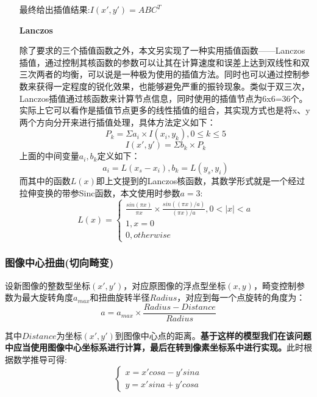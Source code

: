 \documentclass[UTF8]{ctexart}
\begin{document}
\begin{itemize}
最终给出插值结果:$I(x',y')=ABC^T$

    \item [\textbf{Lanczos}]
    
    除了要求的三个插值函数之外，本文另实现了一种实用插值函数——Lanczos插值，通过控制其核函数的参数可以让其在计算速度和误差上达到双线性和双三次两者的均衡，可以说是一种极为使用的插值方法。同时也可以通过控制参数来获得一定程度的锐化效果，也能够避免严重的振铃现象。类似于双三次，Lanczos插值通过核函数来计算节点信息，同时使用的插值节点为6x6=36个。实际上它可以看作是插值节点更多的线性插值的组合，其实现方式也是将x、y两个方向分开来进行插值处理，具体方法定义如下：
    \begin{equation}
        P_k = \Sigma a_i \times I(x_{i},y_{k}), 0 \leq k \leq 5
    \end{equation}
    \begin{equation}
        I(x',y') = \Sigma b_k \times P_k
    \end{equation}
    上面的中间变量$a_i,b_k$定义如下：
    $$a_i = L(x_s - x_{i}), b_k = L(y_s,y_{i})$$
    而其中的函数$L(x)$即上文提到的Lanczos核函数，其数学形式就是一个经过拉伸变换的带参Sinc函数，本文使用时参数$a = 3$:
    \begin{equation}
        L(x) = \begin{cases}
            \frac{sin(\pi x)}{\pi x} \times \frac{sin((\pi x)/a)}{(\pi x)/a} , 0 < |x| < a\\
            1 , x = 0\\
            0, otherwise
        \end{cases}
    \end{equation}
\end{itemize}

\subsubsection{图像中心扭曲(切向畸变)}
设新图像的整数型坐标$(x',y')$，对应原图像的浮点型坐标$(x,y)$，畸变控制参数为最大旋转角度$a_{max}$和扭曲旋转半径$Radius$，对应到每一个点旋转的角度为：
$$a=a_{max}\times \frac{Radius-Distance}{Radius}$$

其中$Distance$为坐标$(x',y')$到图像中心点的距离。\textbf{基于这样的模型我们在该问题中应当使用图像中心坐标系进行计算，最后在转到像素坐标系中进行实现。}此时根据数学推导可得:
\begin{equation}
    \begin{cases}
    x=x'cosa - y'sina\\ 
    y=x'sina+y'cosa
    \end{cases}
\end{equation}
\end{document}

